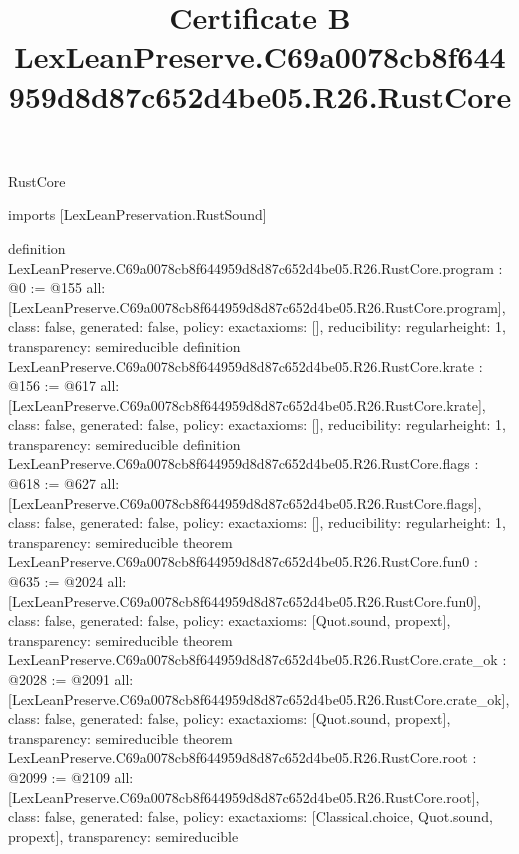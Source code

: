 \begin{lexlean}{RustCore}
\title{Certificate B LexLeanPreserve.C69a0078cb8f644959d8d87c652d4be05.R26.RustCore}
\begin{coremodule}
imports [LexLeanPreservation.RustSound]

definition LexLeanPreserve.C69a0078cb8f644959d8d87c652d4be05.R26.RustCore.program : @0 := @155 {
  all: [LexLeanPreserve.C69a0078cb8f644959d8d87c652d4be05.R26.RustCore.program],
  class: false,
  generated: false,
  policy: exact{axioms: []},
  reducibility: regular{height: 1},
  transparency: semireducible
}
definition LexLeanPreserve.C69a0078cb8f644959d8d87c652d4be05.R26.RustCore.krate : @156 := @617 {
  all: [LexLeanPreserve.C69a0078cb8f644959d8d87c652d4be05.R26.RustCore.krate],
  class: false,
  generated: false,
  policy: exact{axioms: []},
  reducibility: regular{height: 1},
  transparency: semireducible
}
definition LexLeanPreserve.C69a0078cb8f644959d8d87c652d4be05.R26.RustCore.flags : @618 := @627 {
  all: [LexLeanPreserve.C69a0078cb8f644959d8d87c652d4be05.R26.RustCore.flags],
  class: false,
  generated: false,
  policy: exact{axioms: []},
  reducibility: regular{height: 1},
  transparency: semireducible
}
theorem LexLeanPreserve.C69a0078cb8f644959d8d87c652d4be05.R26.RustCore.fun0 : @635 := @2024 {
  all: [LexLeanPreserve.C69a0078cb8f644959d8d87c652d4be05.R26.RustCore.fun0],
  class: false,
  generated: false,
  policy: exact{axioms: [Quot.sound, propext]},
  transparency: semireducible
}
theorem LexLeanPreserve.C69a0078cb8f644959d8d87c652d4be05.R26.RustCore.crate_ok : @2028 := @2091 {
  all: [LexLeanPreserve.C69a0078cb8f644959d8d87c652d4be05.R26.RustCore.crate_ok],
  class: false,
  generated: false,
  policy: exact{axioms: [Quot.sound, propext]},
  transparency: semireducible
}
theorem LexLeanPreserve.C69a0078cb8f644959d8d87c652d4be05.R26.RustCore.root : @2099 := @2109 {
  all: [LexLeanPreserve.C69a0078cb8f644959d8d87c652d4be05.R26.RustCore.root],
  class: false,
  generated: false,
  policy: exact{axioms: [Classical.choice, Quot.sound, propext]},
  transparency: semireducible
}


\end{coremodule}
\end{lexlean}
